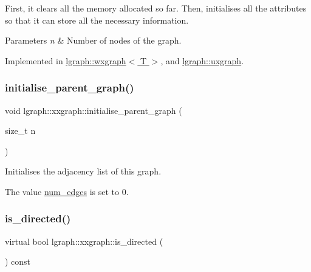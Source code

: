 First, it clears all the memory allocated so far. Then, initialises all the attributes so that it can store all the necessary information.


\begin{DoxyParams}{Parameters}
{\em n} & Number of nodes of the graph. \\
\hline
\end{DoxyParams}


Implemented in \hyperlink{classlgraph_1_1wxgraph_aa09f37bf4a34a0f4f002587203df0125}{lgraph\+::wxgraph$<$ T $>$}, and \hyperlink{classlgraph_1_1uxgraph_a539e735d68b55ce01d733262c9db34d5}{lgraph\+::uxgraph}.

\mbox{\label{classlgraph_1_1xxgraph_a50c658dd39e6b1d38bf7e514daa2f33c}} 
\subsubsection{\texorpdfstring{initialise\+\_\+parent\+\_\+graph()}{initialise\_parent\_graph()}}
{\footnotesize\ttfamily void lgraph\+::xxgraph\+::initialise\+\_\+parent\+\_\+graph (\begin{DoxyParamCaption}\item[{size\+\_\+t}]{n }\end{DoxyParamCaption})\hspace{0.3cm}{\ttfamily [protected]}}



Initialises the adjacency list of this graph. 

The value \hyperlink{classlgraph_1_1xxgraph_a6765a9a3be42f6e0f824635c593b35d7}{num\+\_\+edges} is set to 0. \mbox{\label{classlgraph_1_1xxgraph_a0a606d77cbbb2efa7056b82c3b8c395c}} 
\subsubsection{\texorpdfstring{is\+\_\+directed()}{is\_directed()}}
{\footnotesize\ttfamily virtual bool lgraph\+::xxgraph\+::is\+\_\+directed (\begin{DoxyParamCaption}{ }\end{DoxyParamCaption}) const\hspace{0.3cm}{\ttfamily [pure virtual]}}



